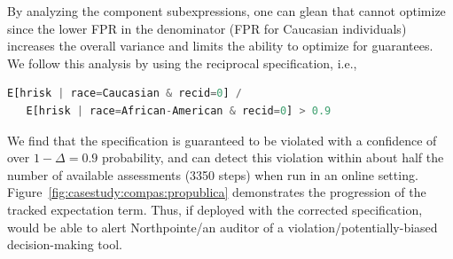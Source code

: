 By analyzing the component subexpressions, one can glean that \AVOIRmethodname{} cannot optimize since the lower FPR in the denominator (FPR for Caucasian individuals) increases the overall variance and limits the ability to optimize for guarantees. 
We follow this analysis by using the reciprocal specification, i.e.,
\begin{lstlisting}[columns=flexible, language=Python, basicstyle=\small]
   E[hrisk | race=Caucasian & recid=0] /
   E[hrisk | race=African-American & recid=0] > 0.9
\end{lstlisting}

We find that the specification is guaranteed to be violated with a confidence of over $1 - \Delta = 0.9$ probability, and \AVOIRmethodname{} can detect this violation within about half the number of available assessments (3350 steps) when run in an online setting.
Figure~\ref{fig:casestudy:compas:propublica} demonstrates the progression of the tracked expectation term. 
Thus, if deployed with the corrected specification, \AVOIRmethodname{} would be able to alert Northpointe/an auditor of a violation/potentially-biased decision-making tool.


